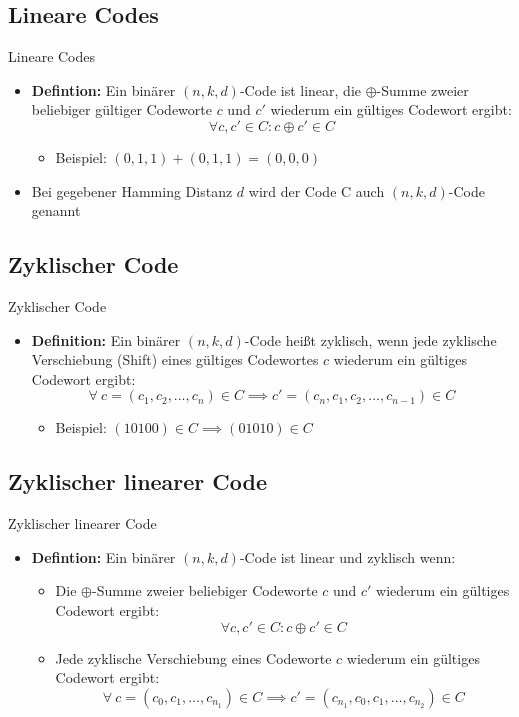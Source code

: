 \documentclass[11pt%
,aspectratio=169%
]{beamer}
\begin{document}
\subsection{Lineare Codes}
\begin{frame}{Lineare Codes}
	\begin{itemize}
		\item \textbf{Defintion:} Ein binärer $(n,k,d)$-Code ist linear, die $\oplus$-Summe zweier beliebiger gültiger Codeworte $c$ und $c'$ wiederum ein gültiges Codewort ergibt:
			\[\forall c,c' \in C \colon c\oplus c' \in C \]
			\begin{itemize}	
		     \item Beispiel: $(0,1,1)+(0,1,1)=(0,0,0)$
	    	\end{itemize}
		\item Bei gegebener Hamming Distanz $d$ wird der Code C auch $(n,k,d)$-Code genannt

	\end{itemize}
\end{frame}



\subsection{Zyklischer Code}
\begin{frame}{Zyklischer Code}
\begin{itemize}
	\item \textbf{Definition:} Ein binärer $(n,k,d)$-Code heißt zyklisch, wenn jede zyklische Verschiebung (Shift) eines gültiges Codewortes $c$ wiederum ein gültiges Codewort ergibt:
			\[\forall ~ c=(c_1,c_2,\dots,c_n) \in C \implies c'=(c_n,c_1,c_2,\dots,c_{n-1}) \in C \]
			\begin{itemize}	
		     \item Beispiel: $(10100) \in C \implies (01010) \in C$
	    	\end{itemize}
	\end{itemize}
\end{frame}

\subsection{Zyklischer linearer Code}
\begin{frame}{Zyklischer linearer Code}
\begin{itemize}
	\item \textbf{Defintion:} Ein binärer $(n,k,d)$-Code ist linear und zyklisch wenn:
			\begin{itemize}	
		     \item Die $\oplus$-Summe zweier beliebiger Codeworte $c$ und $c'$ wiederum ein gültiges Codewort ergibt:
			\[\forall c,c' \in C \colon c\oplus c' \in C \]

	    \item Jede zyklische Verschiebung eines Codeworte $c$ wiederum ein gültiges Codewort ergibt:
			\[\forall ~ c=(c_0,c_1,\dots,c_{n_1}) \in C \implies c'=(c_{n_1},c_0,c_1,\dots,c_{n_2}) \in C \]

	    	\end{itemize}
\end{itemize}
 \end{frame}
 
\end{document}
